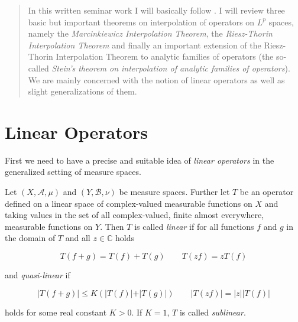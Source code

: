 





\maketitle
\thispagestyle{fancy}

\begin{abstract}
	In this written seminar work I will basically follow \cite[33--48]{grafakos:fourier:2014}. I will review three basic but important theorems on interpolation of operators on $L^p$ spaces, namely the \emph{Marcinkiewicz Interpolation Theorem}, the \emph{Riesz-Thorin Interpolation Theorem} and finally an important extension of the Riesz-Thorin Interpolation Theorem to analytic families of operators (the so-called \emph{Stein's theorem on interpolation of analytic families of operators}). We are mainly concerned with the notion of linear operators as well as slight generalizations of them. 
\end{abstract}

\tableofcontents

\mainsectionstyle

\section{Linear Operators}
First we need to have a precise and suitable idea of \emph{linear operators} in the generalized setting of measure spaces.
\vspace{2mm}
\begin{mdframed}
	\begin{definition}
		Let $(X,\mathcal{A},\mu)$ and $(Y,\mathcal{B},\nu)$ be measure spaces. Further let $T$ be an operator defined on a linear space of complex-valued measurable functions on $X$ and taking values in the set of all complex-valued, finite almost everywhere, measurable functions on $Y$. Then $T$ is called \emph{linear} if for all functions $f$ and $g$ in the domain of $T$ and all $z \in \mathbb{C}$ holds

		\begin{equation}
			T\left( f + g \right) = T(f) + T(g) \qquad T\left( zf \right) = zT(f)
			\label{eq:linear}
		\end{equation}

		and \emph{quasi-linear} if

		\begin{equation}
			\vert T\left( f + g \right) \vert \leqslant K \left( \vert T(f)\vert + \vert T(g)\vert \right) \qquad \vert T(zf) \vert = \vert z\vert \vert T(f)\vert
			\label{eq:quasilinear}
		\end{equation}

		holds for some real constant $K > 0$. If $K = 1$, $T$ is called \emph{sublinear}.
	\end{definition}
\end{mdframed}


